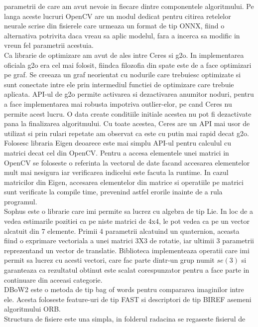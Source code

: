 \documentclass[12pt,a4paper]{report}
\begin{document}
parametrii de care am avut nevoie in fiecare dintre componentele algoritmului. Pe langa aceste 
lucruri OpenCV are un modul dedicat pentru citirea retelelor neurale scrise din fisierele care 
urmeaza un format de tip ONNX, fiind o alternativa potrivita daca vreau sa aplic modelul, fara 
a incerca sa modific in vreun fel parametrii acestuia. \\
Ca librarie de optimizare am avut de ales intre Ceres si g2o. In implementarea oficiala g2o era 
cel mai folosit, fiindca filozofia din spate este de a face optimizari pe graf. Se creeaza un 
graf neorientat cu nodurile care trebuiesc optimizate si sunt conectate intre ele 
prin intermediul functiei de optimizare care trebuie aplicata. API-ul de g2o permite activarea 
si dezactivarea anumitor noduri, pentru a face implementarea mai robusta impotriva outlier-elor,
pe cand Ceres nu permite acest lucru. O data create conditiile initiale acestea nu pot fi 
dezactivate pana la finalizarea algoritmului. Cu toate acestea, Ceres are un API mai usor de 
utilizat si prin rulari repetate am observat ca este cu putin mai rapid decat g2o. \\
Folosesc libraria Eigen deoarece este mai simplu API-ul pentru calculul cu matrici decat 
cel din OpenCV. Pentru a accesa elementele unei matrici in OpenCV se foloseste o referinta la 
vectorul de date facand accesarea elementelor mult mai nesigura iar verificarea indicelui este 
facuta la runtime. In cazul matricilor din Eigen, accesarea elementelor din matrice si operatiile
pe matrici sunt verificate la compile time, prevenind astfel erorile inainte de a rula programul. \\
Sophus este o librarie care imi permite sa lucrez cu algebra de tip Lie. In loc de a vedea
estimarile pozitiei ca pe niste matrici de 4x4, le pot vedea ca pe un vector alcatuit din 7 
elemente. Primii 4 parametrii alcatuind un quaternion, aceasta fiind o exprimare vectoriala 
a unei matrici 3X3 de rotatie, iar ultimii 3 parametrii reprezentand un vector de translatie.
Biblioteca implementeaza operatii care imi permit sa lucrez cu acesti vectori, care fac parte 
dintr-un grup numit \(se(3)\) si garanteaza ca rezultatul obtinut este scalat corespunzator 
pentru a face parte in continuare din aceeasi categorie. \\
DBoW2 este o metoda de tip bag of words pentru compararea imaginilor intre ele. Acesta foloseste 
feature-uri de tip FAST si descriptori de tip BIREF asemeni algoritmului ORB. 
 \\
Structura de fisiere este una simpla, in folderul radacina se regaseste fisierul de 
\end{document}
